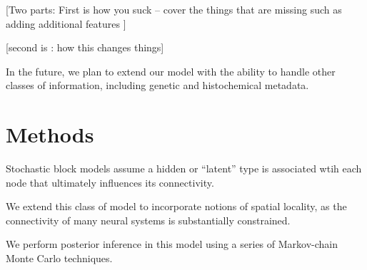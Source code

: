 \documentclass{article}
\begin{document}
[Two parts: First is how you suck -- cover the things that are missing
such as adding additional features ]

[second is : how this changes things]

In the future, we plan to extend our model with the ability to handle
other classes of information, including genetic and histochemical
metadata.



\section{Methods}
Stochastic block models assume a hidden or ``latent'' type is associated
wtih each node that ultimately influences its connectivity. 

We extend this class of model to incorporate notions of spatial locality, 
as the connectivity of many neural systems is substantially constrained. 

We perform posterior inference in this model using a series of Markov-chain
Monte Carlo techniques. 
\end{document}
